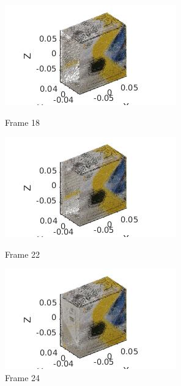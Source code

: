\documentclass[10pt,a4paper]{article}
\begin{document}
\vspace{-30pt}
\hspace{-40pt}
\begin{figure}[!h]
	\begin{minipage}[t]{0.33 \linewidth}
		
		\centering
		\includegraphics[scale=0.5]{box/18.jpg}
		\caption{ \small Frame 18}
	\end{minipage}
	\begin{minipage}[t]{0.33 \linewidth}
		\centering
		\includegraphics[scale=0.5]{box/22.jpg}
		\caption{ \small Frame 22}
	\end{minipage}
	\begin{minipage}[t]{0.33 \linewidth}
		\centering
		\includegraphics[scale=0.5]{box/24.jpg}
		\caption{ \small Frame 24}
	\end{minipage}
\end{figure}
\vspace{-20pt}
\hspace{-40pt}
\end{document}
